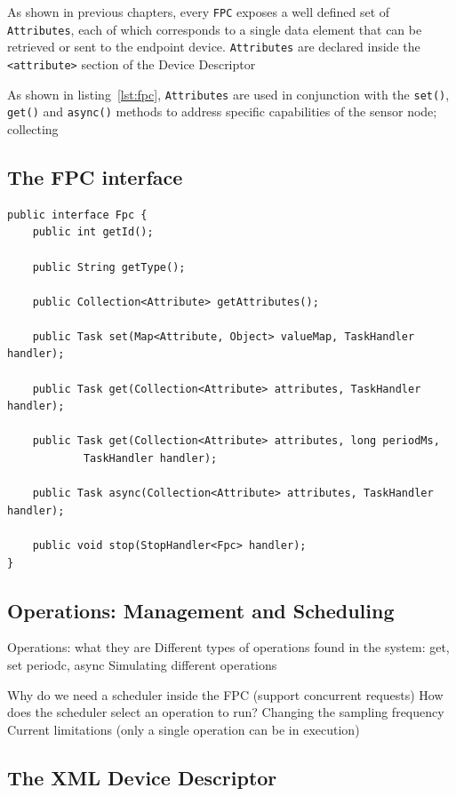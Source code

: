 As shown in previous chapters, every \texttt{FPC} exposes a well defined set of
\texttt{Attributes}, each of which corresponds to a single data element that
can be retrieved or sent to the endpoint device. \texttt{Attributes} are
declared inside the \lstinline!<attribute>! section of the Device Descriptor


As shown in listing~\ref{lst:fpc}, \texttt{Attributes} are
used in conjunction with the \texttt{set()}, \texttt{get()} and
\texttt{async()} methods to address specific capabilities of the sensor node;
collecting  

\subsection{The FPC interface}

\lstset{language=java}
\begin{lstlisting}[float,caption=The FPC interface,label={lst:fpc}]
public interface Fpc {
    public int getId();

    public String getType();

    public Collection<Attribute> getAttributes();

    public Task set(Map<Attribute, Object> valueMap, TaskHandler handler);

    public Task get(Collection<Attribute> attributes, TaskHandler handler);

    public Task get(Collection<Attribute> attributes, long periodMs,
            TaskHandler handler);

    public Task async(Collection<Attribute> attributes, TaskHandler handler);

    public void stop(StopHandler<Fpc> handler);
}
\end{lstlisting}

\subsection{Operations: Management and Scheduling}
\label{sec:fpc.operation}

Operations: what they are
Different types of operations found in the system: get, set periodc, async
Simulating different operations

Why do we need a scheduler inside the FPC (support concurrent requests)
How does the scheduler select an operation to run?
Changing the sampling frequency
Current limitations (only a single operation can be in execution)


\subsection{The XML Device Descriptor}

